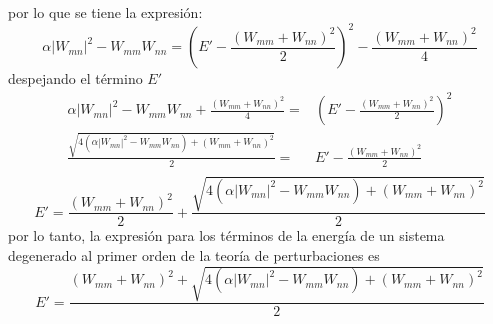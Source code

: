 por lo que se tiene la expresión:
\begin{equation*}
    \alpha \left| W_{mn}\right|^2 -W_{mm}W_{nn} =\left(E'-\frac{\left(W_{mm}+W_{nn}\right)^2}{2}\right)^2- \frac{\left(W_{mm}+W_{nn}\right)^2}{4}
\end{equation*}
despejando el término $E'$
\begin{align*}
    \alpha \left| W_{mn}\right|^2-W_{mm}W_{nn}  + \frac{\left(W_{mm}+W_{nn}\right)^2}{4} =& \left(E'-\frac{\left(W_{mm}+W_{nn}\right)^2}{2}\right)^2\\
    \frac{\sqrt{4\left(\alpha \left| W_{mn} \right|^2-W_{mm}W_{nn}\right)  + \left(W_{mm}+W_{nn}\right)^2}}{2}=&E' -\frac{\left(W_{mm}+W_{nn}\right)^2}{2}\\
\end{align*}
\begin{equation*}
    E'= \frac{\left(W_{mm}+W_{nn}\right)^2}{2}+\frac{\sqrt{4\left(\alpha \left| W_{mn} \right|^2-W_{mm}W_{nn}\right)  + \left(W_{mm}+W_{nn}\right)^2}}{2}
\end{equation*}
por lo tanto, la expresión para los términos de la energía de un sistema degenerado al primer orden de la teoría de perturbaciones es
\begin{equation*}
    E'= \frac{\left(W_{mm}+W_{nn}\right)^2+\sqrt{4\left(\alpha \left| W_{mn} \right|^2-W_{mm}W_{nn}\right)  + \left(W_{mm}+W_{nn}\right)^2}}{2}
\end{equation*}